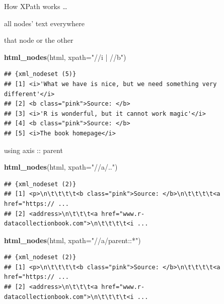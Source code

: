 \documentclass[ignorenonframetext,]{beamer}
\newenvironment{Shaded}{\begin{snugshade}}{\end{snugshade}}
\newcommand{\KeywordTok}[1]{\textcolor[rgb]{0.13,0.29,0.53}{\textbf{{#1}}}}
\newcommand{\DataTypeTok}[1]{\textcolor[rgb]{0.13,0.29,0.53}{{#1}}}
\newcommand{\StringTok}[1]{\textcolor[rgb]{0.31,0.60,0.02}{{#1}}}
\newcommand{\NormalTok}[1]{{#1}}
\begin{document}
\begin{frame}[fragile]{How XPath works \ldots{}}
\begin{block}{all nodes' text everywhere}
\end{block}

\begin{block}{that node or the other}

\begin{Shaded}
\begin{Highlighting}[]
\KeywordTok{html_nodes}\NormalTok{(html, }\DataTypeTok{xpath=}\StringTok{"//i | //b"}\NormalTok{)}
\end{Highlighting}
\end{Shaded}

\begin{verbatim}
## {xml_nodeset (5)}
## [1] <i>'What we have is nice, but we need something very different'</i>
## [2] <b class="pink">Source: </b>
## [3] <i>'R is wonderful, but it cannot work magic'</i>
## [4] <b class="pink">Source: </b>
## [5] <i>The book homepage</i>
\end{verbatim}

\end{block}

\begin{block}{using axis :: parent}

\begin{Shaded}
\begin{Highlighting}[]
\KeywordTok{html_nodes}\NormalTok{(html, }\DataTypeTok{xpath=}\StringTok{"//a/.."}\NormalTok{)}
\end{Highlighting}
\end{Shaded}

\begin{verbatim}
## {xml_nodeset (2)}
## [1] <p>\n\t\t\t\t<b class="pink">Source: </b>\n\t\t\t\t<a href="https:// ...
## [2] <address>\n\t\t\t<a href="www.r-datacollectionbook.com">\n\t\t\t\t<i ...
\end{verbatim}

\begin{Shaded}
\begin{Highlighting}[]
\KeywordTok{html_nodes}\NormalTok{(html, }\DataTypeTok{xpath=}\StringTok{"//a/parent::*"}\NormalTok{)}
\end{Highlighting}
\end{Shaded}

\begin{verbatim}
## {xml_nodeset (2)}
## [1] <p>\n\t\t\t\t<b class="pink">Source: </b>\n\t\t\t\t<a href="https:// ...
## [2] <address>\n\t\t\t<a href="www.r-datacollectionbook.com">\n\t\t\t\t<i ...
\end{verbatim}


\end{block}
\end{frame}
\end{document}
